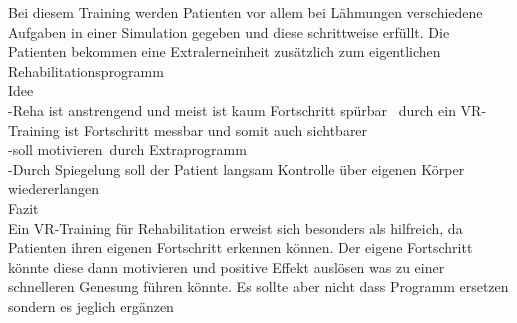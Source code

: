 
Bei diesem Training werden Patienten vor allem bei Lähmungen verschiedene Aufgaben in einer Simulation gegeben und diese schrittweise erfüllt. Die Patienten bekommen eine Extralerneinheit zusätzlich zum eigentlichen Rehabilitationsprogramm\\

Idee\\
-Reha ist anstrengend und meist ist kaum Fortschritt spürbar 
durch ein VR-Training ist Fortschritt messbar und somit auch sichtbarer\\
-soll motivieren durch Extraprogramm\\
-Durch Spiegelung soll der Patient langsam Kontrolle über eigenen Körper wiedererlangen\\

Fazit\\
Ein VR-Training für Rehabilitation erweist sich besonders als hilfreich, da Patienten ihren eigenen Fortschritt erkennen können. Der eigene Fortschritt könnte diese dann motivieren und positive Effekt auslösen was zu einer schnelleren Genesung führen könnte. Es sollte aber nicht dass Programm ersetzen sondern es jeglich ergänzen


